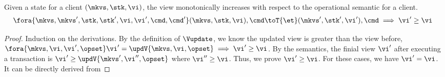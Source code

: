 \begin{lemma}
\label{lem:mono-view}
Given a state for a client \( (\mkvs, \stk, \vi )\), the view monotonically increases with respect to the operational semantic for a client.
\[
    \begin{array}{@{}l}
        \fora{\mkvs, \mkvs', \stk, \stk', \vi, \vi', \cmd, \cmd'} (\mkvs, \stk, \vi), \cmd \toT{\et} (\mkvs', \stk', \vi'), \cmd \implies \vi' \geq \vi
    \end{array}
\]
\end{lemma}
\begin{proof}
    Induction on the derivations.
    By the definition of \( \Vupdate \), we know the updated view is greater than the view before, \ie \( \fora{\mkvs, \vi, \vi', \opset} \vi' = \updV{\mkvs, \vi, \opset} \implies \vi' \geq \vi\).
    By the semantics, the finial view \( \vi' \) after executing a transaction is \( \vi' \geq \updV{\mkvs', \vi'', \opset} \) where \( \vi'' \geq \vi\).
    Thus, we prove \( \vi' \geq \vi \).
    For these cases, we have \( \vi' = \vi\).
    It can be directly derived from \ih
\end{proof}


